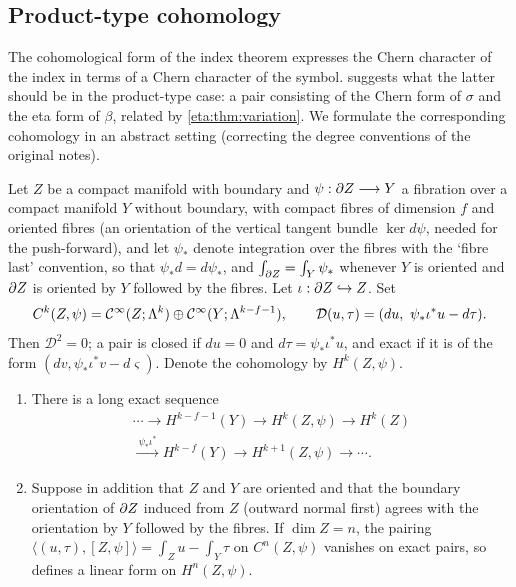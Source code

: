 \subsection{Product-type cohomology} The cohomological form of the index theorem
expresses the Chern character of the index in terms of a Chern character of the symbol.
 suggests what the latter should be in the product-type case: a
pair consisting of the Chern form of $\sigma$ and the eta form of $\beta$, related by
\cref{eta:thm:variation}. We formulate the corresponding cohomology in an abstract
setting (correcting the degree conventions of the original notes).

Let $Z$ be a compact manifold with boundary and $\psi:\partial Z\longrightarrow Y$ a fibration
over a compact manifold $Y$ without boundary, with compact fibres of dimension $f$
and oriented fibres (an orientation of the vertical tangent bundle
$\ker d\psi$, needed for the push-forward), and let $\psi_*$ denote integration over the
fibres with the `fibre last' convention, so that $\psi_*d=d\psi_*$, and
$\int_{\partial Z}=\int_Y\psi_*$ whenever $Y$ is oriented and $\partial Z$ is oriented by $Y$
followed by the fibres. Let $\iota:\partial Z\hookrightarrow Z$. Set
\[
C^k(Z,\psi)=\mathcal{C}^\infty(Z;\Lambda^k)\oplus\mathcal{C}^\infty(Y;\Lambda^{k-f-1}),\qquad
\mathcal D(u,\tau)=(du,\ \psi_*\iota^*u-d\tau).
\]
Then $\mathcal D^2=0$; a pair is closed if $du=0$ and $d\tau=\psi_*\iota^*u$, and exact if
it is of the form $(dv,\psi_*\iota^*v-d\varsigma)$. Denote the cohomology by $H^k(Z,\psi)$.

\begin{proposition}\label{eta:prop:psi-cohomology}
\begin{enumerate}[label=(\roman*)]
\item There is a long exact sequence
\begin{multline*}
\cdots\longrightarrow H^{k-f-1}(Y)\longrightarrow H^k(Z,\psi)\longrightarrow H^k(Z)\\
\xrightarrow{\ \psi_*\iota^*\ }H^{k-f}(Y)\longrightarrow H^{k+1}(Z,\psi)\longrightarrow\cdots.
\end{multline*}
\item Suppose in addition that $Z$ and $Y$ are oriented and that the boundary
orientation of $\partial Z$ induced from $Z$ (outward normal first) agrees with the
orientation by $Y$ followed by the fibres. If $\dim Z=n$, the pairing
$\langle(u,\tau),[Z,\psi]\rangle=\int_Zu-\int_Y\tau$ on $C^n(Z,\psi)$ vanishes on exact
pairs, so defines a linear form on $H^n(Z,\psi)$.
\end{enumerate}
\end{proposition}

